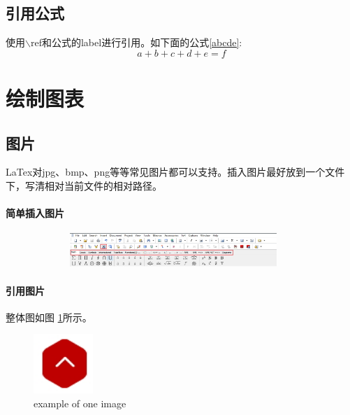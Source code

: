 \documentclass[a4paper,10 pt, conference]{article}     %
\begin{document}
    \subsection{引用公式}
    使用$\backslash$ref和{公式的label}进行引用。如下面的公式\ref{abcde}:
    \begin{equation}\label{abcde}
      a+b+c+d+e=f
    \end{equation}


\section{绘制图表}
    \subsection{图片}
    LaTex对jpg、bmp、png等等常见图片都可以支持。插入图片最好放到一个文件下，写清相对当前文件的相对路径。
    \paragraph{简单插入图片}

    \includegraphics[width=5.00in,height=0.50in]{images/equationHelper.jpg}

    \paragraph{引用图片}

    整体图如图 \ref{label_one-img}所示。
    \begin{figure}[!htbp]
      \centering
      \includegraphics[width = 0.2\textwidth]{images/image1.jpg}
      \caption{example of one image} \label{label_one-img}
    \end{figure}
\end{document}
